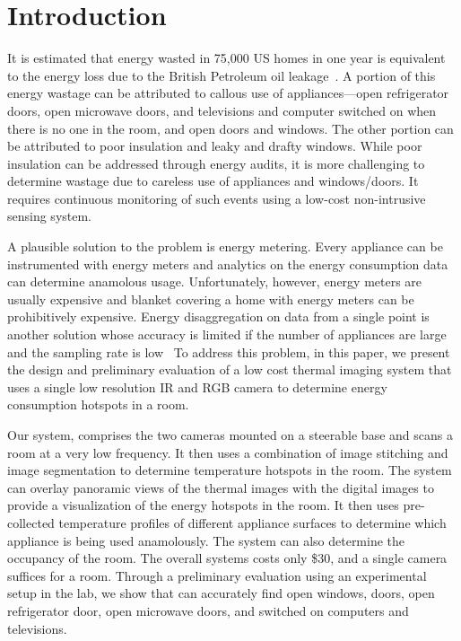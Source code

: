 \section{Introduction}
\label{sec:intro}

It is estimated that energy wasted in 75,000 US homes in one year
is equivalent to the energy loss due to the British Petroleum oil leakage~\cite{XX}. A portion of this energy wastage can
be attributed to callous use of appliances---open refrigerator doors,
open microwave doors, and televisions and computer switched on when 
there is no one in the room, and open doors and windows. The other portion can be attributed to poor insulation and leaky and drafty windows.
While poor insulation can be addressed through energy audits, it is more
challenging to determine wastage due to careless use of appliances and
windows/doors. It requires continuous monitoring of such events
using a low-cost non-intrusive sensing system.

A plausible solution to the problem is energy metering. Every appliance
can be instrumented with energy meters and analytics on the energy
consumption data can determine anamolous usage. Unfortunately, however,
energy meters are usually expensive and blanket covering a home with energy
meters can be prohibitively expensive. Energy disaggregation on data
from a single point is another solution whose accuracy is limited if
the number of appliances are large and the sampling rate is low~\cite{XX}
To address this problem, in this paper, we present the design and preliminary
evaluation of a low cost thermal imaging system that uses a single
low resolution IR and RGB camera to determine energy consumption hotspots
in a room.

Our system, {\IRLeak} comprises the two cameras mounted on a steerable
base and scans a room at a very low frequency. It then uses a combination
of image stitching and image segmentation to determine temperature
hotspots in the room. The system can overlay panoramic views of the thermal
images with the digital images to provide a visualization of the energy
hotspots in the room. It then uses pre-collected temperature profiles
of different appliance surfaces to determine which appliance is being 
used anamolously. The system can also determine the occupancy of the room. The overall systems costs only \$30, and a single camera suffices for a room. Through a preliminary evaluation using an experimental setup in the lab, we show that {\IRLeak} can accurately find open windows, doors, open refrigerator door, open microwave doors, and switched on computers and televisions. 

